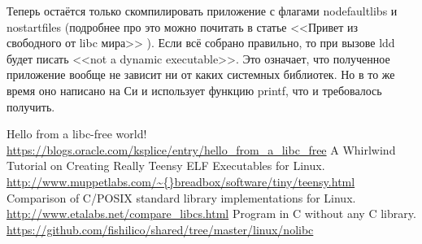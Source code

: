 \documentclass[10pt, a5paper]{article}
\begin{document}
Теперь остаётся только скомпилировать приложение с флагами nodefaultlibs и nostartfiles (подробнее про это можно почитать в статье <<Привет из свободного от libc мира>> \footnotemark[1]). Если всё собрано правильно, то при вызове ldd будет писать <<not a dynamic executable>>. Это означает, что полученное приложение вообще не зависит ни от каких системных библиотек. Но в то же время оно написано на Си и использует функцию printf, что и требовалось получить.

\begin{thebibliography}{99}

 Hello from a libc-free world! \url{https://blogs.oracle.com/ksplice/entry/hello\_from\_a\_libc\_free}
 A Whirlwind Tutorial on Creating Really Teensy ELF Executables for Linux. \url{http://www.muppetlabs.com/\~{}breadbox/software/tiny/teensy.html}
 Comparison of C/POSIX standard library implementations for Linux. \url{http://www.etalabs.net/compare\_libcs.html}
 Program in C without any C library. \url{https://github.com/fishilico/shared/tree/master/linux/nolibc}
\end{thebibliography}
\end{document}
